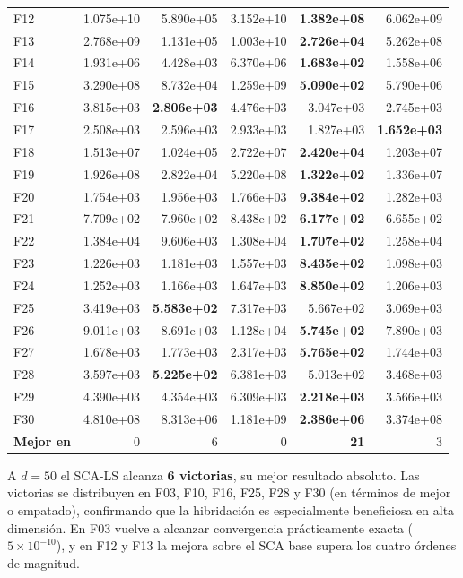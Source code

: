 \documentclass[12pt,a4paper]{article}
\begin{document}
\begin{longtable}{lrrrrr}
F12  & 1.075e+10 & 5.890e+05 & 3.152e+10 & \textbf{1.382e+08} & 6.062e+09 \\
F13  & 2.768e+09 & 1.131e+05 & 1.003e+10 & \textbf{2.726e+04} & 5.262e+08 \\
F14  & 1.931e+06 & 4.428e+03 & 6.370e+06 & \textbf{1.683e+02} & 1.558e+06 \\
F15  & 3.290e+08 & 8.732e+04 & 1.259e+09 & \textbf{5.090e+02} & 5.790e+06 \\
F16  & 3.815e+03 & \textbf{2.806e+03} & 4.476e+03 & 3.047e+03 & 2.745e+03 \\
F17  & 2.508e+03 & 2.596e+03 & 2.933e+03 & 1.827e+03 & \textbf{1.652e+03} \\
F18  & 1.513e+07 & 1.024e+05 & 2.722e+07 & \textbf{2.420e+04} & 1.203e+07 \\
F19  & 1.926e+08 & 2.822e+04 & 5.220e+08 & \textbf{1.322e+02} & 1.336e+07 \\
F20  & 1.754e+03 & 1.956e+03 & 1.766e+03 & \textbf{9.384e+02} & 1.282e+03 \\
F21  & 7.709e+02 & 7.960e+02 & 8.438e+02 & \textbf{6.177e+02} & 6.655e+02 \\
F22  & 1.384e+04 & 9.606e+03 & 1.308e+04 & \textbf{1.707e+02} & 1.258e+04 \\
F23  & 1.226e+03 & 1.181e+03 & 1.557e+03 & \textbf{8.435e+02} & 1.098e+03 \\
F24  & 1.252e+03 & 1.166e+03 & 1.647e+03 & \textbf{8.850e+02} & 1.206e+03 \\
F25  & 3.419e+03 & \textbf{5.583e+02} & 7.317e+03 & 5.667e+02 & 3.069e+03 \\
F26  & 9.011e+03 & 8.691e+03 & 1.128e+04 & \textbf{5.745e+02} & 7.890e+03 \\
F27  & 1.678e+03 & 1.773e+03 & 2.317e+03 & \textbf{5.765e+02} & 1.744e+03 \\
F28  & 3.597e+03 & \textbf{5.225e+02} & 6.381e+03 & 5.013e+02 & 3.468e+03 \\
F29  & 4.390e+03 & 4.354e+03 & 6.309e+03 & \textbf{2.218e+03} & 3.566e+03 \\
F30  & 4.810e+08 & 8.313e+06 & 1.181e+09 & \textbf{2.386e+06} & 3.374e+08 \\
\midrule
\textbf{Mejor en} & 0 & 6 & 0 & \textbf{21} & 3 \\
\end{longtable}
 
A $d=50$ el SCA-LS alcanza \textbf{6 victorias}, su mejor resultado absoluto. Las victorias se distribuyen en F03, F10, F16, F25, F28 y F30 (en términos de mejor o empatado), confirmando que la hibridación es especialmente beneficiosa en alta dimensión. En F03 vuelve a alcanzar convergencia prácticamente exacta ($5 \times 10^{-10}$), y en F12 y F13 la mejora sobre el SCA base supera los cuatro órdenes de magnitud.
 
\end{document}
